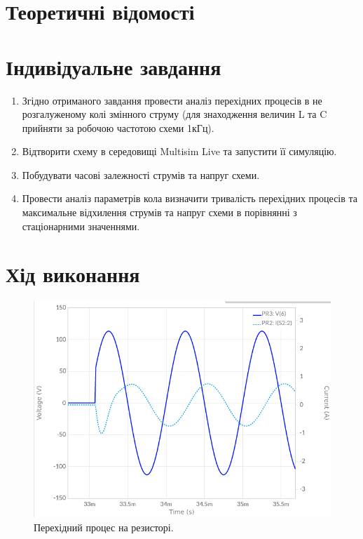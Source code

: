 \documentclass{article}
\begin{document}
\begin{normalsize}
	\section*{Теоретичні відомості}

	
		\section*{Індивідуальне завдання}
	\begin{enumerate}
		\item Згідно отриманого завдання провести аналіз перехідних процесів в не
		розгалуженому колі змінного струму (для знаходження величин L та C
		прийняти за робочою частотою схеми 1кГц).
		\item Відтворити схему в середовищі Multisim Live та запустити її симуляцію.
		\item Побудувати часові залежності струмів та напруг схеми.
		\item Провести аналіз параметрів кола визначити тривалість перехідних
		процесів та максимальне відхилення струмів та напруг схеми в порівнянні
		з стаціонарними значеннями.
	\end{enumerate}
	
	\section*{Хід виконання}
	\begin{figure}[H]
		\centering
		\includegraphics[scale=0.5]{11}
		\caption{Перехідний процес на резисторі.}
	\end{figure}
	

\end{normalsize}
\end{document}
